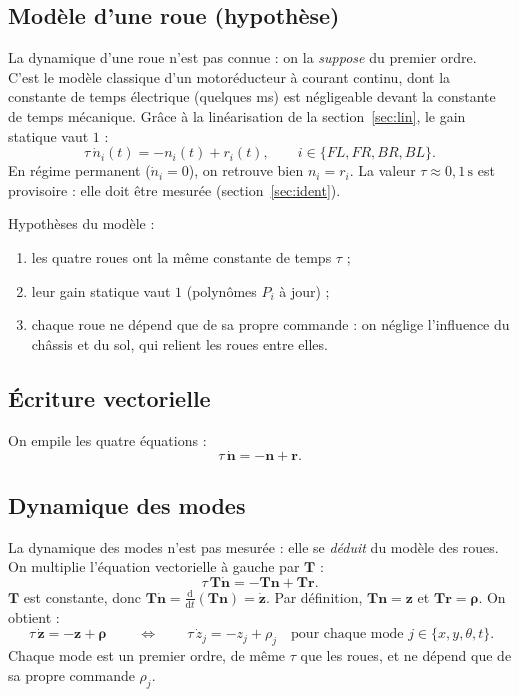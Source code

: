 \documentclass[11pt,a4paper]{article}
\newcommand{\SI}[2]{\ensuremath{#1\,\mathrm{#2}}}
\newcommand{\vect}[1]{\boldsymbol{#1}}
\newcommand{\Tm}{\vect{T}}
\begin{document}
\subsection{Modèle d'une roue (hypothèse)}

La dynamique d'une roue n'est pas connue : on la \emph{suppose} du premier ordre.
C'est le modèle classique d'un motoréducteur à courant continu, dont la constante de temps électrique
(quelques ms) est négligeable devant la constante de temps mécanique.
Grâce à la linéarisation de la section~\ref{sec:lin}, le gain statique vaut $1$ :
\begin{equation}
\tau\,\dot n_i(t)=-n_i(t)+r_i(t),\qquad i\in\{FL,FR,BR,BL\}.
\end{equation}
En régime permanent ($\dot n_i=0$), on retrouve bien $n_i=r_i$.
La valeur $\tau\approx\SI{0{,}1}{s}$ est provisoire : elle doit être mesurée (section~\ref{sec:ident}).

Hypothèses du modèle :
\begin{enumerate}
\item les quatre roues ont la même constante de temps $\tau$ ;
\item leur gain statique vaut $1$ (polynômes $P_i$ à jour) ;
\item chaque roue ne dépend que de sa propre commande : on néglige l'influence du châssis et du sol, qui relient les roues entre elles.
\end{enumerate}

\subsection{Écriture vectorielle}

On empile les quatre équations :
\begin{equation}
\tau\,\dot{\vect n}=-\vect n+\vect r .
\end{equation}

\subsection{Dynamique des modes}

La dynamique des modes n'est pas mesurée : elle se \emph{déduit} du modèle des roues.
On multiplie l'équation vectorielle à gauche par $\Tm$ :
\begin{equation}
\tau\,\Tm\dot{\vect n}=-\Tm\vect n+\Tm\vect r .
\end{equation}
$\Tm$ est constante, donc $\Tm\dot{\vect n}=\frac{\mathrm d}{\mathrm dt}(\Tm\vect n)=\dot{\vect z}$.
Par définition, $\Tm\vect n=\vect z$ et $\Tm\vect r=\vect\rho$. On obtient :
\begin{equation}
\boxed{\ \tau\,\dot{\vect z}=-\vect z+\vect\rho\ }
\qquad\Longleftrightarrow\qquad
\tau\,\dot z_j=-z_j+\rho_j\quad\text{pour chaque mode } j\in\{x,y,\theta,t\}.
\end{equation}
Chaque mode est un premier ordre, de même $\tau$ que les roues, et ne dépend que de sa propre commande $\rho_j$.
\end{document}
